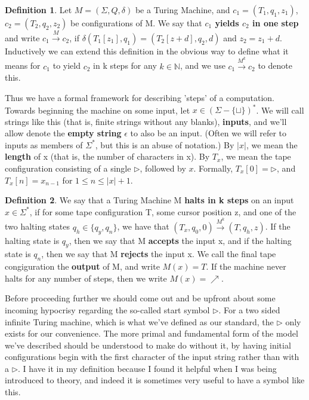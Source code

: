 \documentclass{article}
\theoremstyle{definition}
\newtheorem{definition}{Definition}[section]
\theoremstyle{plain}
\theoremstyle{theorem}
\begin{document}
\begin{definition}
Let $M=(\Sigma,Q,\delta)$ be a Turing Machine, and $c_1=(T_1,q_1,z_1)$, $c_2=(T_2,q_2,z_2)$ be configurations of M. We say that \textbf{$c_1$ yields $c_2$ in one step} and write $c_1 \overset{M}{\to} c_2$, if $\delta(T_1[z_1],q_1)=(T_2[z+d],q_2,d)$ and $z_2=z_1+d$. Inductively we can extend this definition in the obvious way to define what it means for $c_1$ to yield $c_2$ in k steps for any $k\in\mathbb{N}$, and we use $c_1 \overset{M^k}{\to} c_2$ to denote this.
\end{definition}
Thus we have a formal framework for describing 'steps' of a computation. Towards beginning the machine on some input, let $x\in(\Sigma-\{\sqcup\})^*$. We will call strings like this (that is, finite strings without any blanks), \textbf{inputs}, and we'll allow denote the \textbf{empty string} $\epsilon$ to also be an input. (Often we will refer to inputs as members of $\Sigma^*$, but this is an abuse of notation.) By $|x|$, we mean the \textbf{length} of x (that is, the number of characters in x). By $T_x$, we mean the tape configuration consisting of a single $\triangleright$, followed by $x$. Formally, $T_x[0]=\triangleright$, and $T_x[n]=x_{n-1}$ for $1\leq n \leq |x|+1$. 
\begin{definition}
We say that a Turing Machine M \textbf{halts in k steps} on an input $x\in\Sigma^*$, if for some tape configuration T, some cursor position z, and one of the two halting states $q_h \in \{q_y,q_n\}$, we have that $(T_x,q_0,0) \overset{M^k}{\to} (T,q_h,z)$. If the halting state is $q_y$, then we say that M \textbf{accepts} the input x, and if the halting state is $q_n$, then we say that M \textbf{rejects} the input x. We call the final tape congiguration the \textbf{output} of M, and write $M(x)=T$. If the machine never halts for any number of steps, then we write $M(x)=\nearrow$. 
\end{definition}
Before proceeding further we should come out and be upfront about some incoming hypocrisy regarding the so-called start symbol $\triangleright$. For a two sided infinite Turing machine, which is what we've defined as our standard, the $\triangleright$ only exists for our convenience. The more primal and fundamental form of the model we've described should be understood to make do without it, by having initial configurations begin with the first character of the input string rather than with a $\triangleright$. I have it in my definition because I found it helpful when I was being introduced to theory, and indeed it is sometimes very useful to have a symbol like this. \par 
\end{document}
